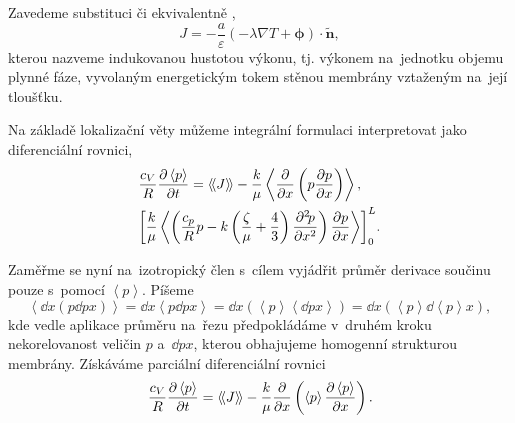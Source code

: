 Zavedeme substituci  či ekvivalentně \Unit{\!}{\watt\per\cubic\meter},
\begin{equation}
    J=-\frac{a}{\varepsilon}\left(-\lambda \nabla T + \bm{\phi}\right)\cdot\bm{\tilde{n}},
\end{equation}
kterou nazveme indukovanou hustotou výkonu, tj. výkonem na~jednotku objemu plynné fáze, vyvolaným energetickým tokem stěnou membrány vztaženým na~její tloušťku. 

Na základě lokalizační věty můžeme integrální formulaci interpretovat jako diferenciální rovnici,
\begin{subequations}
\begin{align}
    &\frac{c_V}{R}\frac{\partial \left\langle p\right\rangle}{\partial t}=\left\langle\!\left\langle J \right\rangle\!\right\rangle-\frac{k}{\mu}\left\langle \frac{\partial }{\partial x}\left(p\frac{\partial p}{\partial x}\right)\right\rangle,\\
    &{\left[\frac{k}{\mu}\left\langle \left(\frac{c_p}{R} p - k\left(\frac{\zeta}{\mu}+\frac{4}{3}\right)\frac{\partial^2 \! p}{\partial x^2}\right)\frac{\partial p}{\partial x}\right\rangle \right]}_0^L.
\end{align}
\end{subequations}

Zaměřme se nyní na~izotropický člen s~cílem vyjádřit průměr derivace součinu pouze s~pomocí $\left\langle p \right\rangle$. Píšeme
\begin{equation}
    \left\langle \dd{}{x}\left(p\dd{p}{x}\right)\right\rangle=\dd{}{x}\left\langle p\dd{p}{x}\right\rangle=\dd{}{x}\left(\left\langle p\right\rangle\left\langle\dd{p}{x}\right\rangle\right)=\dd{}{x}\left(\left\langle p\right\rangle\dd{\left\langle p\right\rangle}{x}\right),
\end{equation}
kde vedle aplikace průměru na~řezu předpokládáme v~druhém kroku nekorelovanost veličin $p$ a~$\dd{p}{x}$, kterou obhajujeme homogenní strukturou membrány. Získáváme parciální diferenciální rovnici
\begin{equation}
    \frac{c_V}{R}\frac{\partial \left\langle p\right\rangle}{\partial t}=\left\langle\!\left\langle J \right\rangle\!\right\rangle-\frac{k}{\mu}\frac{\partial }{\partial x}\left(\left\langle p\right\rangle\frac{\partial \left\langle p\right\rangle}{\partial x}\right).
\end{equation}


